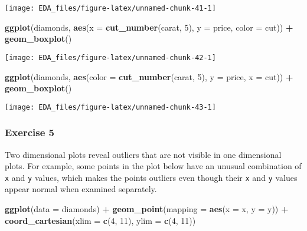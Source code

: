 \documentclass[]{book}
\newenvironment{Shaded}{\begin{snugshade}}{\end{snugshade}}
\newcommand{\DataTypeTok}[1]{\textcolor[rgb]{0.13,0.29,0.53}{#1}}
\newcommand{\DecValTok}[1]{\textcolor[rgb]{0.00,0.00,0.81}{#1}}
\newcommand{\KeywordTok}[1]{\textcolor[rgb]{0.13,0.29,0.53}{\textbf{#1}}}
\newcommand{\NormalTok}[1]{#1}
\newcommand{\OperatorTok}[1]{\textcolor[rgb]{0.81,0.36,0.00}{\textbf{#1}}}
\newcommand{\StringTok}[1]{\textcolor[rgb]{0.31,0.60,0.02}{#1}}
\theoremstyle{definition}
\theoremstyle{definition}
\theoremstyle{definition}
\theoremstyle{remark}
\begin{document}
\begin{center}\texttt{[image: EDA\_files/figure-latex/unnamed-chunk-41-1]} \end{center}

\begin{Shaded}
\begin{Highlighting}[]
\KeywordTok{ggplot}\NormalTok{(diamonds, }\KeywordTok{aes}\NormalTok{(}\DataTypeTok{x =} \KeywordTok{cut_number}\NormalTok{(carat, }\DecValTok{5}\NormalTok{), }\DataTypeTok{y =}\NormalTok{ price, }\DataTypeTok{color =}\NormalTok{ cut)) }\OperatorTok{+}
\StringTok{  }\KeywordTok{geom_boxplot}\NormalTok{()}
\end{Highlighting}
\end{Shaded}

\begin{center}\texttt{[image: EDA\_files/figure-latex/unnamed-chunk-42-1]} \end{center}

\begin{Shaded}
\begin{Highlighting}[]
\KeywordTok{ggplot}\NormalTok{(diamonds, }\KeywordTok{aes}\NormalTok{(}\DataTypeTok{color =} \KeywordTok{cut_number}\NormalTok{(carat, }\DecValTok{5}\NormalTok{), }\DataTypeTok{y =}\NormalTok{ price, }\DataTypeTok{x =}\NormalTok{ cut)) }\OperatorTok{+}
\StringTok{  }\KeywordTok{geom_boxplot}\NormalTok{()}
\end{Highlighting}
\end{Shaded}

\begin{center}\texttt{[image: EDA\_files/figure-latex/unnamed-chunk-43-1]} \end{center}

\hypertarget{exercise-5-4}{%
\subsubsection{Exercise 5}\label{exercise-5-4}}

Two dimensional plots reveal outliers that are not visible in one
dimensional plots. For example, some points in the plot below have an
unusual combination of \texttt{x} and \texttt{y} values, which makes the
points outliers even though their \texttt{x} and \texttt{y} values
appear normal when examined separately.

\begin{Shaded}
\begin{Highlighting}[]
\KeywordTok{ggplot}\NormalTok{(}\DataTypeTok{data =}\NormalTok{ diamonds) }\OperatorTok{+}
\StringTok{  }\KeywordTok{geom_point}\NormalTok{(}\DataTypeTok{mapping =} \KeywordTok{aes}\NormalTok{(}\DataTypeTok{x =}\NormalTok{ x, }\DataTypeTok{y =}\NormalTok{ y)) }\OperatorTok{+}
\StringTok{  }\KeywordTok{coord_cartesian}\NormalTok{(}\DataTypeTok{xlim =} \KeywordTok{c}\NormalTok{(}\DecValTok{4}\NormalTok{, }\DecValTok{11}\NormalTok{), }\DataTypeTok{ylim =} \KeywordTok{c}\NormalTok{(}\DecValTok{4}\NormalTok{, }\DecValTok{11}\NormalTok{))}
\end{Highlighting}
\end{Shaded}
\end{document}
